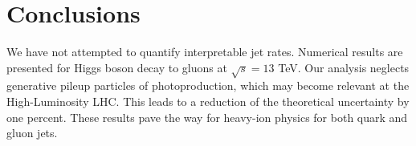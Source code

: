 \section{Conclusions}\label{sec:conclusions}

We have not attempted to quantify interpretable jet rates. Numerical
results are presented for Higgs boson decay to gluons at $\sqrt{s} = 13$
TeV. Our analysis neglects generative pileup particles of
photoproduction, which may become relevant at the High-Luminosity LHC.
This leads to a reduction of the theoretical uncertainty by one percent.
These results pave the way for heavy-ion physics for both quark and
gluon jets.

